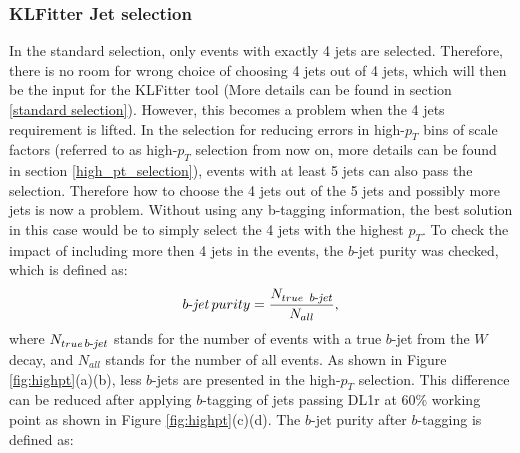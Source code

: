 \documentclass[letterpaper,12pt]{article}
\newcommand\bjetineq{\mathop{\mbox{$b$-$\mathit{jet}$}}}
\newcommand\bjetunder{\mathop{\footnotesize{\mbox{$b$-$\mathit{jet}$}}}\normalsize}
\begin{document}
\subsubsection{KLFitter Jet selection}
In the standard selection, only events with exactly 4 jets are selected. Therefore, there is no room for wrong choice of choosing 4 jets out of 4 jets, which will then be the input for the KLFitter tool (More details can be found in section \ref{standard selection}). However, this becomes a problem when the 4 jets requirement is lifted. In the selection for reducing errors in high-$p_{T}$ bins of scale factors (referred to as high-$p_{T}$ selection from now on, more details can be found in section \ref{high_pt_selection}), events with at least 5 jets can also pass the selection. Therefore how to choose the 4 jets out of the 5 jets and possibly more jets is now a problem. Without using any b-tagging information, the best solution in this case would be to simply select the 4 jets with the highest $p_T$. %
To check the impact of including more then 4 jets in the events, the $b$-jet purity was checked, which is defined as:
\begin{equation}
\bjetineq purity= \frac{N_{true\ \bjetunder}}{N_{all}},
\end{equation}
where $N_{true \bjetunder}$ stands for the number of events with a true $b$-jet from the $W$ decay, and $N_{all}$ stands for the number of all events.
As shown in Figure \ref{fig:highpt}(a)(b), less $b$-jets are presented in the high-$p_{T}$ selection. This difference can be reduced after applying $b$-tagging of jets passing DL1r at 60\% working point as shown in Figure \ref{fig:highpt}(c)(d). The $b$-jet purity after $b$-tagging is defined as:
\end{document}
